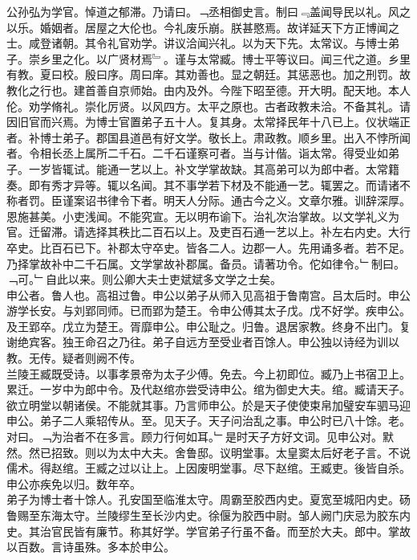 \documentclass{zhvt-classic}
\begin{document}
\hspace*{2em}公孙弘为学官。悼道之郁滞。乃请曰。﹁丞相御史言。制曰﹃盖闻导民以礼。风之以乐。婚姻者。居屋之大伦也。今礼废乐崩。朕甚愍焉。故详延天下方正博闻之士。咸登诸朝。其令礼官劝学。讲议洽闻兴礼。以为天下先。太常议。与博士弟子。崇乡里之化。以广贤材焉﹄。谨与太常臧。博士平等议曰。闻三代之道。乡里有教。夏曰校。殷曰序。周曰庠。其劝善也。显之朝廷。其惩恶也。加之刑罚。故教化之行也。建首善自京师始。由内及外。今陛下昭至德。开大明。配天地。本人伦。劝学脩礼。崇化厉贤。以风四方。太平之原也。古者政教未洽。不备其礼。请因旧官而兴焉。为博士官置弟子五十人。复其身。太常择民年十八已上。仪状端正者。补博士弟子。郡国县道邑有好文学。敬长上。肃政教。顺乡里。出入不悖所闻者。令相长丞上属所二千石。二千石谨察可者。当与计偕。诣太常。得受业如弟子。一岁皆辄试。能通一艺以上。补文学掌故缺。其高弟可以为郎中者。太常籍奏。即有秀才异等。辄以名闻。其不事学若下材及不能通一艺。辄罢之。而请诸不称者罚。臣谨案诏书律令下者。明天人分际。通古今之义。文章尔雅。训辞深厚。恩施甚美。小吏浅闻。不能究宣。无以明布谕下。治礼次治掌故。以文学礼义为官。迁留滞。请选择其秩比二百石以上。及吏百石通一艺以上。补左右内史。大行卒史。比百石已下。补郡太守卒史。皆各二人。边郡一人。先用诵多者。若不足。乃择掌故补中二千石属。文学掌故补郡属。备员。请著功令。佗如律令。﹂制曰。﹁可。﹂自此以来。则公卿大夫士吏斌斌多文学之士矣。\\
\hspace*{2em}申公者。鲁人也。高祖过鲁。申公以弟子从师入见高祖于鲁南宫。吕太后时。申公游学长安。与刘郢同师。已而郢为楚王。令申公傅其太子戊。戊不好学。疾申公。及王郢卒。戊立为楚王。胥靡申公。申公耻之。归鲁。退居家教。终身不出门。复谢绝宾客。独王命召之乃往。弟子自远方至受业者百馀人。申公独以诗经为训以教。无传。疑者则阙不传。\\
\hspace*{2em}兰陵王臧既受诗。以事孝景帝为太子少傅。免去。今上初即位。臧乃上书宿卫上。累迁。一岁中为郎中令。及代赵绾亦尝受诗申公。绾为御史大夫。绾。臧请天子。欲立明堂以朝诸侯。不能就其事。乃言师申公。於是天子使使束帛加璧安车驷马迎申公。弟子二人乘轺传从。至。见天子。天子问治乱之事。申公时已八十馀。老。对曰。﹁为治者不在多言。顾力行何如耳。﹂是时天子方好文词。见申公对。默然。然已招致。则以为太中大夫。舍鲁邸。议明堂事。太皇窦太后好老子言。不说儒术。得赵绾。王臧之过以让上。上因废明堂事。尽下赵绾。王臧吏。後皆自杀。申公亦疾免以归。数年卒。\\
\hspace*{2em}弟子为博士者十馀人。孔安国至临淮太守。周霸至胶西内史。夏宽至城阳内史。砀鲁赐至东海太守。兰陵缪生至长沙内史。徐偃为胶西中尉。邹人阙门庆忌为胶东内史。其治官民皆有廉节。称其好学。学官弟子行虽不备。而至於大夫。郎中。掌故以百数。言诗虽殊。多本於申公。\\
\end{document}
